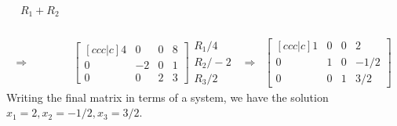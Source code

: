 \documentclass[10pt]{article}
\begin{document}
$$\begin{array}{rlcl}
\begin{array}{lr} R_1+R_2\\ \ \\ \ \end{array}
\\ \\ \Rightarrow&
\begin{bmatrix}[ccc|c] 4&0&0&8\\0&-2&0&1\\0&0&2&3\end{bmatrix} 
\begin{array}{lr} R_1/4\\R_2/-2\\R_3/2 \end{array}
&\Rightarrow&  
\begin{bmatrix}[ccc|c] 1&0&0&2\\0&1&0&-1/2\\0&0&1&3/2\end{bmatrix} 
\end{array}
$$
Writing the final matrix in terms of a system, we have the solution {$x_1=2, x_2=-1/2, x_3=3/2$}.
\end{document}
